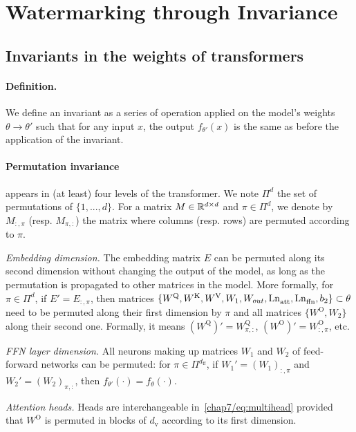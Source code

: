 

\section{Watermarking through Invariance}\label{chap7/sec:method}


\subsection{Invariants in the weights of transformers}

\paragraph*{Definition.}
We define an invariant as a series of operation applied on the model's weights $\theta \rightarrow \theta ' $ such that for any input $x$, the output $f_{\theta'}(x)$ is the same as before the application of the invariant.


\paragraph*{Permutation invariance} appears in (at least) four levels of the transformer.
We note $\Pi^d$ the set of permutations of $\{1,..., d\}$. 
For a matrix $M\in\mathbb{R}^{d\times d}$ and $\pi \in \Pi^d$, we denote by $M_{:,\pi}$ (resp. $M_{\pi,:}$) the matrix where columns (resp. rows) are permuted according to $\pi$.

\noindent
\emph{Embedding dimension.} 
The embedding matrix $E$ can be permuted along its second dimension without changing the output of the model, as long as the permutation is propagated to other matrices in the model. 
More formally, for $\pi \in \Pi^d$, if $E' = E_{:,\pi}$, then matrices $\{ W^\mathrm{Q}, W^\mathrm{K}, W^\mathrm{V}, W_1, W_{out}, \mathrm{Ln}_{\mathrm{att}}^{}, \mathrm{Ln}_{\mathrm{ffn}}^{}, b_2 \} \subset \theta$ need to be permuted along their first dimension by $\pi$ and all matrices $\{ W^\mathrm{O}, W_2 \}$ along their second one.
Formally, it means 
$(W^\mathrm{Q})' = W^\mathrm{Q}_{\pi, :}$, $(W^\mathrm{O})' = W^\mathrm{O}_{:, \pi}$, etc.

\noindent
\emph{FFN layer dimension.}
All neurons making up matrices $W_1$ and $W_2$ of feed-forward networks can be permuted:
for $\pi \in \Pi^{d_\mathrm{ff}}$, if $W_1' = (W_1)_{:,\pi}$ and $W_2' = (W_2)_{\pi,:}$, then $f_{\theta'}(\cdot) = f_{\theta}(\cdot)$.

\noindent
\emph{Attention heads.}
Heads are interchangeable in~\eqref{chap7/eq:multihead} provided that $W^\mathrm{O}$ is permuted in blocks of $d_\mathrm{v}$ according to its first dimension.

